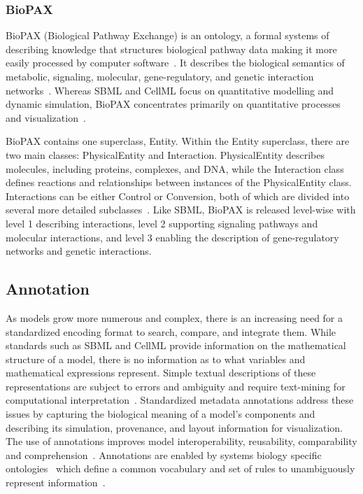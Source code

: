 \documentclass[12pt]{report}
\begin{document}
\subsubsection{BioPAX}
BioPAX (Biological Pathway Exchange) is an ontology, a formal systems of describing knowledge that structures biological pathway data making it more easily processed by computer software~\cite{demir_biopax_2010}. It describes the biological semantics of metabolic, signaling, molecular, gene-regulatory, and genetic interaction networks~\cite{demir_biopax_2010}. Whereas SBML and CellML focus on quantitative modelling and dynamic simulation, BioPAX concentrates primarily on quantitative processes and visualization~\cite{demir_biopax_2010, buchel_qualitative_2012}.  

BioPAX contains one superclass, Entity. Within the Entity superclass, there are two main classes: PhysicalEntity and Interaction. PhysicalEntity describes molecules, including proteins, complexes, and DNA, while the Interaction class defines reactions and relationships between instances of the PhysicalEntity class. Interactions can be either Control or Conversion, both of which are divided into several more detailed subclasses~\cite{demir_biopax_2010, buchel_qualitative_2012}. Like SBML, BioPAX is released level-wise with level 1 describing interactions, level 2 supporting signaling pathways and molecular interactions, and level 3 enabling the description of gene-regulatory networks and genetic interactions.

\subsection{Annotation}

As models grow more numerous and complex, there is an increasing need for a standardized encoding format to search, compare, and integrate them. While standards such as SBML and CellML provide information on the mathematical structure of a model, there is no information as to what variables and mathematical expressions represent. Simple textual descriptions of these representations are subject to errors and ambiguity and require text-mining for computational interpretation~\cite{Curtout2011}. Standardized metadata annotations address these issues by capturing the biological meaning of a model's components and describing its simulation, provenance, and layout information for visualization. The use of annotations improves model interoperability, reusability, comparability and comprehension~\cite{Gennari2021}. Annotations are enabled by systems biology specific ontologies~\cite{Wimalaratne2009} which define a common vocabulary and set of rules to unambiguously represent information~\cite{Noy2001OntologyD1}.
 
\end{document}
